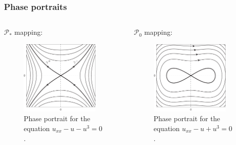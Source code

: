 \documentclass [10pt] {beamer}
\begin{document}
\begin{frame}
	\frametitle{Phase portraits}
	\begin{columns}[T]
		\begin{column}{.5\textwidth}
			$\mathcal{P}_*$ mapping:
			\begin{figure}
			\includegraphics[width = 0.9\textwidth]{pic/phase-portrait-1.pdf}
			\caption{Phase portrait for the equation $u_{xx} - u - u^3 = 0$.}
			\label{pic:phase-portrait-1}
			\end{figure}
		\end{column}
		\hfil
		\begin{column}{.5\textwidth}
			$\mathcal{P}_0$ mapping:
			\begin{figure}
			\includegraphics[width = 0.9\textwidth]{pic/phase-portrait-2.pdf}
			\caption{Phase portrait for the equation $u_{xx} - u + u^3 = 0$.}
			\label{pic:phase-portrait-2}
			\end{figure}
		\end{column}
	\end{columns}
	

\end{frame}
\end{document}
